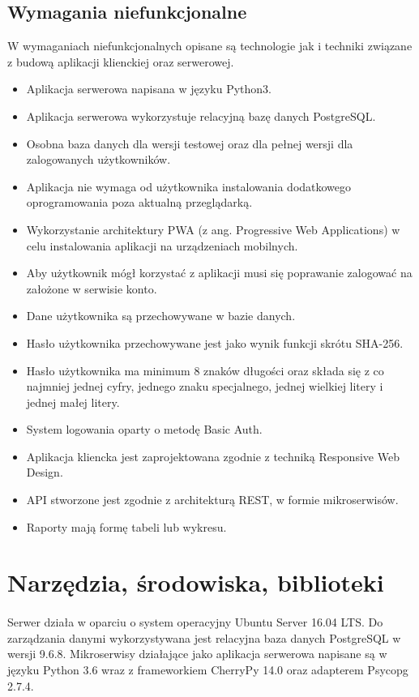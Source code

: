 \documentclass{article}
\begin{document}
	\subsection{Wymagania niefunkcjonalne}
	W wymaganiach niefunkcjonalnych opisane są technologie jak i techniki związane z budową aplikacji klienckiej oraz serwerowej.
	\begin{itemize}
		\item Aplikacja serwerowa napisana w języku Python3.
		\item Aplikacja serwerowa wykorzystuje relacyjną bazę danych PostgreSQL.
		\item Osobna baza danych dla wersji testowej oraz dla pełnej wersji dla zalogowanych użytkowników.
		\item Aplikacja nie wymaga od użytkownika instalowania dodatkowego oprogramowania poza aktualną przeglądarką.
		\item Wykorzystanie architektury PWA (z ang. Progressive Web Applications) w celu instalowania aplikacji na urządzeniach mobilnych.
		\item Aby użytkownik mógł korzystać z aplikacji musi się poprawanie zalogować na założone w serwisie konto.
		\item Dane użytkownika są przechowywane w bazie danych.
		\item Hasło użytkownika przechowywane jest jako wynik funkcji skrótu SHA-256.
		\item Hasło użytkownika ma minimum 8 znaków długości oraz składa się z co najmniej jednej cyfry, jednego znaku specjalnego, jednej wielkiej litery i jednej małej litery.
		\item System logowania oparty o metodę Basic Auth.
		\item Aplikacja kliencka jest zaprojektowana zgodnie z techniką Responsive Web Design.
		\item API stworzone jest zgodnie z architekturą REST, w formie mikroserwisów.
		\item Raporty mają formę tabeli lub wykresu.
	\end{itemize}
	\section{Narzędzia, środowiska, biblioteki}
	\paragraph{}Serwer działa w oparciu o system operacyjny Ubuntu Server 16.04 LTS.
	Do zarządzania danymi wykorzystywana jest relacyjna baza danych PostgreSQL w wersji 9.6.8.
	Mikroserwisy działające jako aplikacja serwerowa napisane są w języku Python 3.6 wraz z frameworkiem CherryPy 14.0 oraz adapterem Psycopg 2.7.4. 
\end{document}
